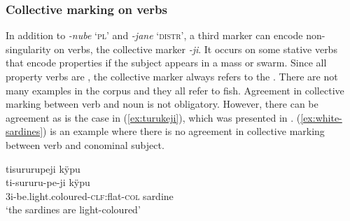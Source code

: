 

%





\subsubsection{Collective marking on verbs}\label{CollectiveVerbs}

In addition to \textit{-nube} ‘\textsc{pl}’ and \textit{-jane} ‘\textsc{distr}’, a third marker can encode non-singu\-lar\-ity on verbs, the collective marker \textit{-ji}. It occurs on some stative verbs  that encode properties if the subject appears in a mass or swarm. Since all property verbs are , the collective marker always refers to the . There are not many examples in the corpus and they all refer to fish. Agreement in collective marking between verb and noun is not obligatory. However, there can be agreement as is the case in (\ref{ex:turukeji}), which was presented in . (\ref{ex:white-sardines}) is an example where there is no agreement in collective marking between verb and conominal subject.

\ea\label{ex:white-sardines}
\begingl 
\glpreamble tisururupeji kÿpu\\
\gla ti-sururu-pe-ji kÿpu\\ 
\glb 3i-be.light.coloured-\textsc{clf}:flat-\textsc{col} sardine\\ 
\glft ‘the sardines are light-coloured’
\trailingcitation{[jxx-e150925l-1.162]}
\xe

